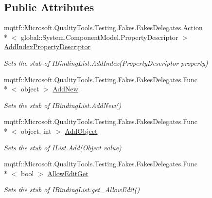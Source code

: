 \subsection*{Public Attributes}
\begin{DoxyCompactItemize}
\item 
mqttf\-::\-Microsoft.\-Quality\-Tools.\-Testing.\-Fakes.\-Fakes\-Delegates.\-Action\\*
$<$ global\-::\-System.\-Component\-Model.\-Property\-Descriptor $>$ \hyperlink{class_system_1_1_component_model_1_1_fakes_1_1_stub_i_binding_list_view_af917169839f15bdda6a0b348766b38c8}{Add\-Index\-Property\-Descriptor}
\begin{DoxyCompactList}\small\item\em Sets the stub of I\-Binding\-List.\-Add\-Index(\-Property\-Descriptor property)\end{DoxyCompactList}\item 
mqttf\-::\-Microsoft.\-Quality\-Tools.\-Testing.\-Fakes.\-Fakes\-Delegates.\-Func\\*
$<$ object $>$ \hyperlink{class_system_1_1_component_model_1_1_fakes_1_1_stub_i_binding_list_view_a81b950346334350286b3b5737b4b4a1e}{Add\-New}
\begin{DoxyCompactList}\small\item\em Sets the stub of I\-Binding\-List.\-Add\-New()\end{DoxyCompactList}\item 
mqttf\-::\-Microsoft.\-Quality\-Tools.\-Testing.\-Fakes.\-Fakes\-Delegates.\-Func\\*
$<$ object, int $>$ \hyperlink{class_system_1_1_component_model_1_1_fakes_1_1_stub_i_binding_list_view_ad95ad6959fa46eede04a4308cad75ab2}{Add\-Object}
\begin{DoxyCompactList}\small\item\em Sets the stub of I\-List.\-Add(\-Object value)\end{DoxyCompactList}\item 
mqttf\-::\-Microsoft.\-Quality\-Tools.\-Testing.\-Fakes.\-Fakes\-Delegates.\-Func\\*
$<$ bool $>$ \hyperlink{class_system_1_1_component_model_1_1_fakes_1_1_stub_i_binding_list_view_ac974b3059c27b9b52ab09f27ba82178f}{Allow\-Edit\-Get}
\begin{DoxyCompactList}\small\item\em Sets the stub of I\-Binding\-List.\-get\-\_\-\-Allow\-Edit()\end{DoxyCompactList}\item 

\end{DoxyCompactItemize}
